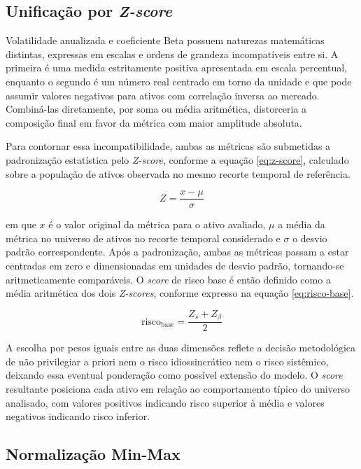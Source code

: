 \subsection{Unificação por \textit{Z-score}}

Volatilidade anualizada e coeficiente Beta possuem naturezas matemáticas distintas, expressas em escalas e ordens de grandeza incompatíveis entre si. A primeira é uma medida estritamente positiva apresentada em escala percentual, enquanto o segundo é um número real centrado em torno da unidade e que pode assumir valores negativos para ativos com correlação inversa ao mercado. Combiná-las diretamente, por soma ou média aritmética, distorceria a composição final em favor da métrica com maior amplitude absoluta.

Para contornar essa incompatibilidade, ambas as métricas são submetidas a padronização estatística pelo \textit{Z-score}, conforme a equação \ref{eq:z-score}, calculado sobre a população de ativos observada no mesmo recorte temporal de referência.

\begin{equation}
\label{eq:z-score}
Z = \frac{x - \mu}{\sigma}
\end{equation}

\noindent em que \(x\) é o valor original da métrica para o ativo avaliado, \(\mu\) a média da métrica no universo de ativos no recorte temporal considerado e \(\sigma\) o desvio padrão correspondente. Após a padronização, ambas as métricas passam a estar centradas em zero e dimensionadas em unidades de desvio padrão, tornando-se aritmeticamente comparáveis. O \textit{score} de risco base é então definido como a média aritmética dos dois \textit{Z-scores}, conforme expresso na equação \ref{eq:risco-base}.

\begin{equation}
\label{eq:risco-base}
\text{risco}_{\text{base}} = \frac{Z_{s} + Z_{\beta}}{2}
\end{equation}

A escolha por pesos iguais entre as duas dimensões reflete a decisão metodológica de não privilegiar a priori nem o risco idiossincrático nem o risco sistêmico, deixando essa eventual ponderação como possível extensão do modelo. O \textit{score} resultante posiciona cada ativo em relação ao comportamento típico do universo analisado, com valores positivos indicando risco superior à média e valores negativos indicando risco inferior.

\subsection{Normalização Min-Max}

